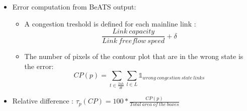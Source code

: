 \begin{itemize}
		\item Error computation from BeATS output:
		\begin{itemize}
			\item A congestion treshold is defined for each mainline link :
			\begin{equation*} 
				\frac{Link\ capacity}{Link\ freeflow\ speed}+\delta
			\end{equation*}
			\item The number of pixels of the contour plot that are in the wrong state is the error:
			\begin{equation*}
				CP(p)=\sum_{t\in{\frac{24h}{dt}}}\sum_{l\in{L}}\mathds{1}_{wrong\ congestion\ state\ links}
			\end{equation*}
			\end{itemize}
		\item Relative difference : $\tau_{p}(CP)=100* \frac{CP(p)}{Total\ area\ of\ the\ boxes}$
	\end{itemize}
